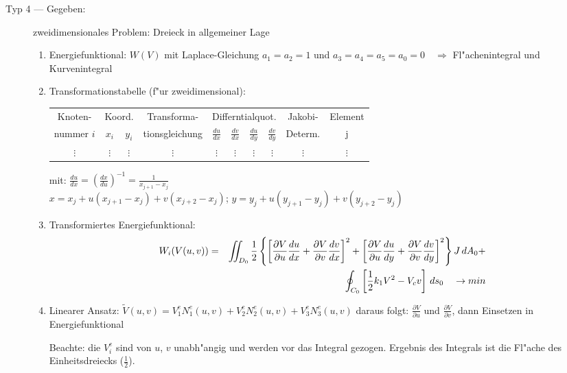 \begin{description}
\item[Typ 4 --- Gegeben:] zweidimensionales Problem: Dreieck in allgemeiner Lage
   \begin{enumerate}
   \item Energiefunktional: $W(V)$ mit Laplace-Gleichung $a_1=a_2=1$ und
         $a_3=a_4=a_5=a_0=0\quad\Rightarrow$ Fl"achenintegral und Kurvenintegral
   \item Transformationstabelle (f"ur zweidimensional):
      \begin{center}
      \begin{tabular}{|c|c|c|c|c|c|c|c|c|c|}
      Knoten-   &\multicolumn{2}{|c|}{Koord.}& Transforma-& \multicolumn{4}{|c|}{Differntialquot.}& Jakobi-& Element\\
      nummer $i$&       $x_i$ & $y_i$        & tionsgleichung
      &$\frac{du}{dx}$&$\frac{dv}{dx}$&$\frac{du}{dy}$&$\frac{dv}{dy}$& Determ.&
      j   \\ \hline
       $\vdots$&$\vdots$&$\vdots$&$\vdots$&$\vdots$&$\vdots$&$\vdots$&$\vdots$&$\vdots$&$\vdots$\\
      \end{tabular}
      \end{center}
      mit: $\frac{du}{dx}=\left(\frac{dx}{du}\right)^{-1}=\frac{1}{x_{j+1}-x_j}$\\
      $x=x_j+u(x_{j+1}-x_j) + v(x_{j+2}-x_j)$;
      $y=y_j+u(y_{j+1}-y_j) + v(y_{j+2}-y_j)$
   \item Transformiertes Energiefunktional:
    \begin{eqnarray*}
     W_i(V(u,v))&=&\int\!\!\!\!\int_{D_0} \frac{1}{2} \left\{\left[\frac{\partial V}{\partial
     u}\frac{du}{dx} + \frac{\partial V}{\partial v} \frac{dv}{dx} \right]^2 +
     \left[\frac{\partial V}{\partial u}\frac{du}{dy} + \frac{\partial V}{\partial v}
     \frac{dv}{dy} \right]^2  \right\}J\, dA_0 +\\
     &&\oint_{C_0} \left[\frac{1}{2} k_1 V^2 - V_cv\right] \, ds_0 \quad \rightarrow
     min  \end{eqnarray*}
   \item Linearer Ansatz: $\tilde{V}(u,v)= V_1^e N_1^e(u,v) + V_2^e N_2^e(u,v)
      + V_3^e N_3^e(u,v)$ daraus folgt: $\frac{\partial V}{\partial u}$ und
      $\frac{\partial V}{\partial v}$, dann Einsetzen in Energiefunktional

      Beachte: die $V_i^e$ sind von $u$, $v$ unabh"angig und werden vor das
      Integral gezogen. Ergebnis des Integrals ist die Fl"ache des
      Einheitsdreiecks ($\frac{1}{2}$).
   \end{enumerate}


\end{description}
